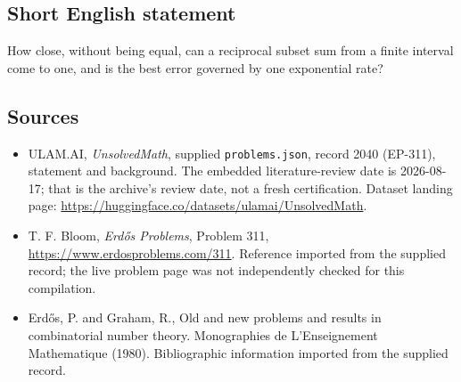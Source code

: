\documentclass[11pt,a4paper]{article}
\begin{document}
\subsection{Short English statement}

How close, without being equal, can a reciprocal subset sum from a finite interval come to one, and is the best error governed by one exponential rate?

\subsection{Sources}

{\small

\begin{itemize}

\item[\hypertarget{source:2040:1}{S1}] ULAM.AI, \emph{UnsolvedMath}, supplied \texttt{problems.json}, record 2040 (EP-311), statement and background. The embedded literature-review date is 2026-08-17; that is the archive’s review date, not a fresh certification. Dataset landing page: \url{https://huggingface.co/datasets/ulamai/UnsolvedMath}.

\item[\hypertarget{source:2040:2}{S2}] T. F. Bloom, \emph{Erdős Problems}, Problem 311, \url{https://www.erdosproblems.com/311}. Reference imported from the supplied record; the live problem page was not independently checked for this compilation.

\item[\hypertarget{source:2040:3}{S3}] Erd\H{o}s, P. and Graham, R., Old and new problems and results in combinatorial number theory. Monographies de L'Enseignement Mathematique (1980). Bibliographic information imported from the supplied record.

\end{itemize}

}

\label{end:2040}
\end{document}
